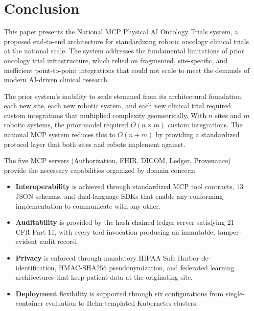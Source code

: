 \section{Conclusion}
\label{sec:conclusion}

This paper presents the National MCP Physical AI Oncology Trials system, a proposed end-to-end architecture for standardizing robotic oncology clinical trials at the national scale. The system addresses the fundamental limitations of prior oncology trial infrastructure, which relied on fragmented, site-specific, and inefficient point-to-point integrations that could not scale to meet the demands of modern AI-driven clinical research.

The prior system's inability to scale stemmed from its architectural foundation: each new site, each new robotic system, and each new clinical trial required custom integrations that multiplied complexity geometrically. With $n$ sites and $m$ robotic systems, the prior model required $O(n \times m)$ custom integrations. The national MCP system reduces this to $O(n + m)$ by providing a standardized protocol layer that both sites and robots implement against.

The five MCP servers (Authorization, FHIR, DICOM, Ledger, Provenance) provide the necessary capabilities organized by domain concern:

\begin{itemize}[leftmargin=*]
\item \textbf{Interoperability} is achieved through standardized MCP tool contracts, 13 JSON schemas, and dual-language SDKs that enable any conforming implementation to communicate with any other.
\item \textbf{Auditability} is provided by the hash-chained ledger server satisfying 21 CFR Part 11, with every tool invocation producing an immutable, tamper-evident audit record.
\item \textbf{Privacy} is enforced through mandatory HIPAA Safe Harbor de-identification, HMAC-SHA256 pseudonymization, and federated learning architectures that keep patient data at the originating site.
\item \textbf{Deployment} flexibility is supported through six configurations from single-container evaluation to Helm-templated Kubernetes clusters.
\end{itemize}

